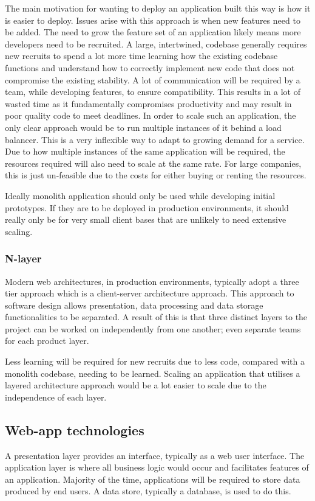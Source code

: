 The main motivation for wanting to deploy an application built this way is how it is easier to deploy\cite{namiot2014micro}.
Issues arise with this approach is when new features need to be added. The need to grow the feature set of an application likely means
more developers need to be recruited. A large, intertwined, codebase generally requires new recruits to spend a lot more time learning
how the existing codebase functions and understand how to correctly implement new code that does not compromise the existing stability.
A lot of communication will be required by a team, while developing features, to ensure compatibility.
This results in a lot of wasted time as it fundamentally compromises productivity and may result in poor quality code to meet deadlines.
In order to scale such an application, the only clear approach would be to run multiple instances of it behind a load balancer.
This is a very inflexible way to adapt to growing demand for a service.
Due to how multiple instances of the same application will be required, the resources required will also need to scale at the same rate.
For large companies, this is just un-feasible due to the costs for either buying or renting the resources. 

Ideally monolith application should only be used while developing initial prototypes. If they are to be deployed in production environments,
it should really only be for very small client bases that are unlikely to need extensive scaling.

\subsubsection{N-layer}

Modern web architectures, in production environments, typically adopt a three tier approach which is a client-server architecture approach.
This approach to software design allows presentation, data processing and data storage functionalities to be separated.
A result of this is that three distinct layers to the project can be worked on independently from one another; even separate teams for
each product layer. 

Less learning will be required for new recruits due to less code, compared with a monolith codebase, needing to be learned.
Scaling an application that utilises a layered architecture approach would be a lot easier to scale due to the independence of each layer.

\subsection{Web-app technologies}
A presentation layer provides an interface, typically as a web user interface.
The application layer is where all business logic would occur and facilitates features of an application.
Majority of the time, applications will be required to store data produced by end users. A data store, typically a database, is
used to do this.

